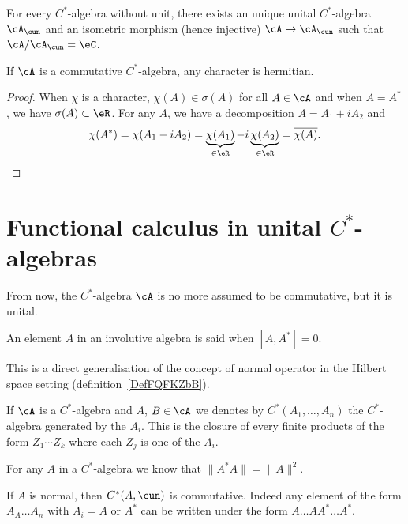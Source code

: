 \begin{proposition}
	For every $C^*$-algebra without unit, there exists an unique unital $C^*$-algebra $\cA_{\cun}$ and an isometric morphism (hence injective) $\cA\to\cA_{\cun}$ such that $\cA/\cA_{\cun}=\eC$.
	\label{prop_unitariz_csa}
\end{proposition}

\begin{proposition}
	If $\cA$ is a commutative $C^*$-algebra, any character is hermitian.
\end{proposition}

\begin{proof}
	When $\chi$ is a character, $\chi(A)\in\sigma(A)$ for all $A\in\cA$ and when $A=A^*$, we have $\sigma(A)\subset\eR$. For any $A$, we have a decomposition $A=A_1+iA_2$ and
	\[
		\chi(A^*)=\chi(A_1-iA_2)=\underbrace{\chi(A_1)}_{\in\eR}-i\underbrace{\chi(A_2)}_{\in\eR}=\overline{ \chi(A) }.
	\]
\end{proof}

\section{Functional calculus in unital \texorpdfstring{$C^*$}{C}-algebras}

From now, the $C^*$-algebra $\cA$ is no more assumed to be commutative, but it is unital.

\begin{definition}      \label{DefElemNormal}
	An element $A$ in an involutive algebra is said  when $[A,A^*]=0$.
\end{definition}
This is a direct generalisation of the concept of normal operator in the Hilbert space setting (definition~\ref{DefFQFKZbB}).

If $\cA$ is a $C^{*}$-algebra and $A$, $B\in\cA$ we denotes by $C^*(A_1,\ldots,A_n)$ the $C^{*}$-algebra generated by the $A_i$. This is the closure of every finite products of the form $Z_1\cdots Z_k$ where each $Z_j$ is one of the $A_i$.

For any $A$ in a $C^{*}$-algebra we know that $\|A^*A\|=\|A\|^2$.

If $A$ is normal, then $C^*(A,\cun)$ is commutative. Indeed any element of the form $A_A\ldots A_n$ with $A_i=A$ or $A^*$ can be written under the form $A\ldots AA^*\ldots A^*$.

